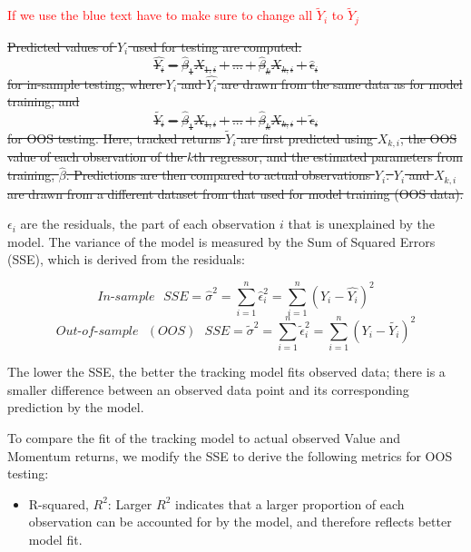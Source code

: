 \documentclass[AER]{AEA}
\begin{document}
\begin{spacing}{2}
\textcolor{red}{If we use the blue text have to make sure to change all $\tilde{Y}_i$ to $\tilde{Y}_j$}

\sout{Predicted values of $Y_i$ used for testing are computed:
\begin{equation} \hat{Y_i}=\hat{\beta}_1X_{1,i}+{...}+\hat{\beta}_{k}X_{k,i}+\hat{\epsilon}_i\label{eq:4}
\end{equation}
for in-sample testing, where \(Y_i\) and \(\hat{Y_i}\) are drawn from the same data as for model training; and
\begin{equation} \tilde{Y_i}=\hat{\beta}_1X_{1,i}+{...}+\hat{\beta}_{k}X_{k,i}+\tilde{\epsilon}_i\label{eq:5}
\end{equation}
for OOS testing. Here, tracked returns \(\tilde{Y}_i\) are first predicted using \(X_{k,i}\), the OOS value of each observation of the $k$th regressor, and the estimated parameters from training, $\hat{\beta}$. Predictions are then compared to actual observations $Y_i$. \(Y_i\) and \(X_{k,i}\) are drawn from a different dataset from that used for model training (OOS data).}

\(\epsilon_i\) are the residuals, the part of each observation $i$ that is unexplained by the model. The variance of the model is measured by the Sum of Squared Errors (SSE), which is derived from the residuals:

\begin{equation}
    In\text{-}sample \text{ }SSE=\hat{\sigma}^2=\sum_{i=1}^n\hat{\epsilon}_i^2=\sum_{i=1}^n(Y_i-\hat{Y_i})^2\label{eq:6}
    \end{equation}
\begin{equation}
    Out\text{-}of\text{-}sample \text{ $(OOS)$ }SSE=\tilde{\sigma}^2=\sum_{i=1}^n\tilde{\epsilon}_i^2=\sum_{i=1}^n(Y_i-\tilde{Y_i})^2\label{eq:7}
    \end{equation}

The lower the SSE, the better the tracking model fits observed data; there is a smaller difference between an observed data point and its corresponding prediction by the model.

To compare the fit of the tracking model to actual observed Value and Momentum returns, we modify the SSE to derive the following metrics for OOS testing:

\begin{itemize}
    \item R-squared, \(R^2\): Larger \(R^2\) indicates that a larger proportion of each observation can be accounted for by the model, and therefore reflects better model fit.


\end{itemize}
\end{spacing}
\end{document}
